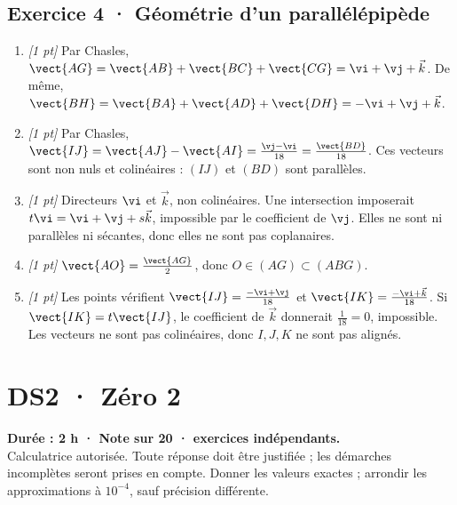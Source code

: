 \subsection*{Exercice 4 · Géométrie d'un parallélépipède}\begin{enumerate}

\item \textit{[1 pt]} Par Chasles, $\vect{AG}=\vect{AB}+\vect{BC}+\vect{CG}=\vi +\vj +\vec k$. De même, $\vect{BH}=\vect{BA}+\vect{AD}+\vect{DH}=-\vi +\vj +\vec k$.

\item \textit{[1 pt]} Par Chasles, $\vect{IJ}=\vect{AJ}-\vect{AI}=\frac{\vj -\vi }{18}=\frac{\vect{BD}}{18}$. Ces vecteurs sont non nuls et colinéaires : $(IJ)$ et $(BD)$ sont parallèles.

\item \textit{[1 pt]} Directeurs $\vi $ et $\vec k$, non colinéaires. Une intersection imposerait $t\vi =\vi +\vj +s\vec k$, impossible par le coefficient de $\vj $. Elles ne sont ni parallèles ni sécantes, donc elles ne sont pas coplanaires.

\item \textit{[1 pt]} $\vect{AO}=\frac{\vect{AG}}{2}$, donc $O\in(AG)\subset(ABG)$.

\item \textit{[1 pt]} Les points vérifient $\vect{IJ}=\frac{-\vi +\vj }{18}$ et $\vect{IK}=\frac{-\vi +\vec k}{18}$. Si $\vect{IK}=t\vect{IJ}$, le coefficient de $\vec k$ donnerait $\frac{1}{18}=0$, impossible. Les vecteurs ne sont pas colinéaires, donc $I,J,K$ ne sont pas alignés.

\end{enumerate}

\fi

\mxnewpage{}\label{sujet:2-2}

\section*{DS2 · Zéro 2}


\textbf{Durée : 2 h · Note sur 20 ·  exercices indépendants.}\\Calculatrice autorisée. Toute réponse doit être justifiée ; les démarches incomplètes seront prises en compte. Donner les valeurs exactes ; arrondir les approximations à $10^{-4}$, sauf précision différente.

